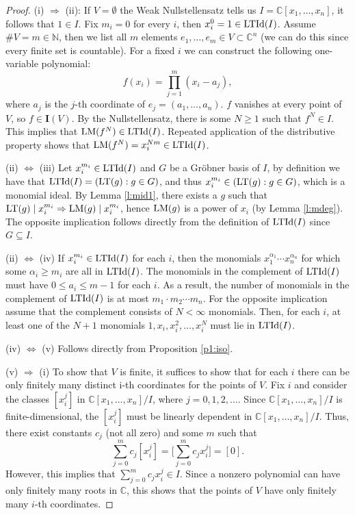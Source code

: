 \documentclass[a4paper,12pt]{article}
\newcommand{\CC}{\mathbb{C}}
\newcommand{\NN}{\mathbb{N}}
\newcommand{\LM }{{\rm LM}}
\newcommand{\LT }{{\rm LT}}
\newcommand{\LTId }{{\rm LTId}}
\newcommand{\divides}{\mid}
\newcommand{\idl}{\textbf{I}}
\begin{document}
\begin{proof}
	(i) $\Rightarrow$ (ii): If $V = \emptyset$ the Weak Nullstellensatz tells us $I = \CC[x_1, \ldots, x_n]$, it follows that $1 \in I$. Fix $m_i = 0$ for every $i$, then $x_i^0 = 1 \in \LTId(I)$. Assume $\#V = m \in \NN$, then we list all $m$ elements $e_1, \ldots, e_m \in V \subset \CC^n$ (we can do this since every finite set is countable). For a fixed $i$ we can construct the following one-variable polynomial:
	$$ f(x_i) = \prod_{j=1}^{m} (x_i - a_j),$$
where $a_j$ is the $j$-th coordinate of $e_j = (a_1, \ldots, a_n)$. $f$ vanishes at every point of $V$, so $f \in \idl(V)$. By the Nullstellensatz, there is some $N \geq 1$ such that $f^N \in I$. This implies that $\LM(f^N) \in \LTId(I)$. Repeated application of the distributive property shows that $\LM(f^N)=x_i^{Nm} \in \LTId(I)$.


(ii) $\Leftrightarrow$ (iii) Let $x_i^{m_i} \in \LTId(I)$ and $G$ be a Gr\"obner basis of $I$, by definition we have that $\LTId(I) = (\LT(g) : g \in G)$, and thus $x_i^{m_i} \in (\LT(g) : g \in G)$, which is a monomial ideal. By Lemma \ref{l:mid1}, there exists a $g$ such that $\LT(g) \divides x_i^{m_i} \Rightarrow \LM(g) \divides x_i^{m_i}$, hence $\LM(g)$ is a power of $x_i$ (by Lemma \ref{l:mdeg}). The opposite implication follows directly from the definition of $\LTId(I)$ since $G \subseteq I$.


(ii) $\Leftrightarrow$ (iv)
If $x_i^{m_i} \in \LTId(I)$ for each $i$, then the monomials $x_1^{\alpha_1} \cdots x_n^{\alpha_n}$ for which some $\alpha_i \geq m_i$ are all in $\LTId(I)$. The monomials in the complement of $\LTId(I)$ must have $0 \leq a_i \leq m-1$ for each $i$. As a result, the number of monomials in the complement of $\LTId(I)$ is at most $m_1 \cdot m_2 \cdots m_n$. For the opposite implication assume that the complement consists of $N < \infty$ monomials. Then, for each $i$, at least one of the $N+1$ monomials $1, x_i, x_i^2, \ldots, x_i^N$ must lie in $\LTId(I)$.

(iv) $\Leftrightarrow$ (v) Follows directly from Proposition \ref{p1:iso}.


(v) $\Rightarrow$ (i)
To show that $V$ is finite, it suffices to show that for each $i$ there can be only finitely many distinct i-th coordinates for the points of $V$. Fix $i$ and consider the classes $[x_i^j]$ in $\CC[x_1,\ldots,x_n]/I$, where $j=0,1,2,\ldots$. Since $\CC[x_1,\ldots, x_n]/I$ is finite-dimensional, the $[x_i^j]$ must be linearly dependent in $\CC[x_1,\ldots,x_n]/I$. Thus, there exist constants $c_j$ (not all zero) and some $m$ such that $$ \sum_{j=0}^{m} c_j[x_i^j] = \Big[ \sum_{j=0}^{m} c_jx_i^j \Big] =  [0].$$
However, this implies that $\sum_{j=0}^{m} c_jx_i^j \in I$. Since a nonzero polynomial can have only finitely many roots in $\CC$, this shows that the points of $V$ have only finitely many $i$-th coordinates.
\end{proof}
\end{document}
